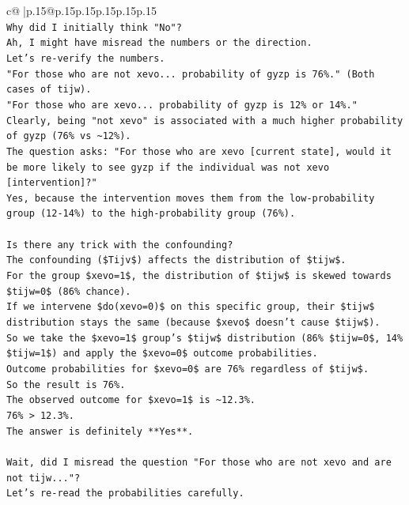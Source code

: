 \documentclass{article}
\begin{document}
{\begin{supertabular}{c@{$\;$}|p{.15\linewidth}@{}p{.15\linewidth}p{.15\linewidth}p{.15\linewidth}p{.15\linewidth}p{.15\linewidth}}
{{{\\ 
\texttt{Why did I initially think "No"?} \\
\texttt{Ah, I might have misread the numbers or the direction.} \\
\texttt{Let's re{-}verify the numbers.} \\
\texttt{"For those who are not xevo... probability of gyzp is 76\%." (Both cases of tijw).} \\
\texttt{"For those who are xevo... probability of gyzp is 12\% or 14\%."} \\
\texttt{Clearly, being "not xevo" is associated with a much higher probability of gyzp (76\% vs \textasciitilde{}12\%).} \\
\texttt{The question asks: "For those who are xevo {[}current state{]}, would it be more likely to see gyzp if the individual was not xevo {[}intervention{]}?"} \\
\texttt{Yes, because the intervention moves them from the low{-}probability group (12{-}14\%) to the high{-}probability group (76\%).} \\
\\ 
\texttt{Is there any trick with the confounding?} \\
\texttt{The confounding (\$Tijv\$) affects the distribution of \$tijw\$.} \\
\texttt{For the group \$xevo=1\$, the distribution of \$tijw\$ is skewed towards \$tijw=0\$ (86\% chance).} \\
\texttt{If we intervene \$do(xevo=0)\$ on this specific group, their \$tijw\$ distribution stays the same (because \$xevo\$ doesn't cause \$tijw\$).} \\
\texttt{So we take the \$xevo=1\$ group's \$tijw\$ distribution (86\% \$tijw=0\$, 14\% \$tijw=1\$) and apply the \$xevo=0\$ outcome probabilities.} \\
\texttt{Outcome probabilities for \$xevo=0\$ are 76\% regardless of \$tijw\$.} \\
\texttt{So the result is 76\%.} \\
\texttt{The observed outcome for \$xevo=1\$ is \textasciitilde{}12.3\%.} \\
\texttt{76\% > 12.3\%.} \\
\texttt{The answer is definitely **Yes**.} \\
\\ 
\texttt{Wait, did I misread the question "For those who are not xevo and are not tijw..."?} \\
\texttt{Let's re{-}read the probabilities carefully.} \\
}}}
\end{supertabular}}
\end{document}
